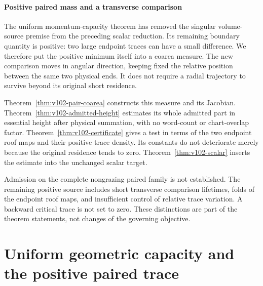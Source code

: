 \documentclass[11pt,reqno]{amsart}
\numberwithin{equation}{section}
\theoremstyle{definition}\newtheorem{definition}[theorem]{Definition}
\theoremstyle{remark}\newtheorem{remark}[theorem]{Remark}
\theoremstyle{definition}\newtheorem{inputstatement}[theorem]{Input statement}
\begin{document}


\subsection{Positive paired mass and a transverse comparison}
The uniform momentum-capacity theorem has removed the singular
volume-source premise from the preceding scalar reduction. Its
remaining boundary quantity is positive: two large endpoint traces
can have a small difference. We therefore put the positive minimum
itself into a coarea measure. The new comparison moves in angular
direction, keeping fixed the relative position between the same two
physical ends. It does not require a radial trajectory to survive
beyond its original short residence.

Theorem~\ref{thm:v102-pair-coarea} constructs this measure and its
Jacobian. Theorem~\ref{thm:v102-admitted-height} estimates its whole
admitted part in essential height after physical summation, with no
word-count or chart-overlap factor. Theorem~\ref{thm:v102-certificate}
gives a test in terms of the two endpoint roof maps and their positive
trace density. Its constants do not deteriorate merely because the
original residence tends to zero. Theorem~\ref{thm:v102-scalar}
inserts the estimate into the unchanged scalar target.

Admission on the complete nongrazing paired family is not established.
The remaining positive source includes short transverse comparison
lifetimes, folds of the endpoint roof maps, and insufficient control
of relative trace variation. A backward critical trace is not set to
zero. These distinctions are part of the theorem statements, not
changes of the governing objective.






\appendix


\endgroup
\part{Uniform geometric capacity and the positive paired trace}
\begingroup
\let\ArchiveLabel\label
\let\ArchiveRef\ref
\renewcommand{\label}[1]{\ArchiveLabel{v100archive:#1}}
\renewcommand{\ref}[1]{%
  \IfBeginWith{#1}{supp-}{%
    \StrBehind{#1}{supp-}[\ArchiveTarget]%
    \ArchiveRef{\ArchiveTarget}%
  }{\ArchiveRef{v100archive:#1}}%
}
\makeatletter
\let\ltx@label\label
\makeatother
\end{document}
